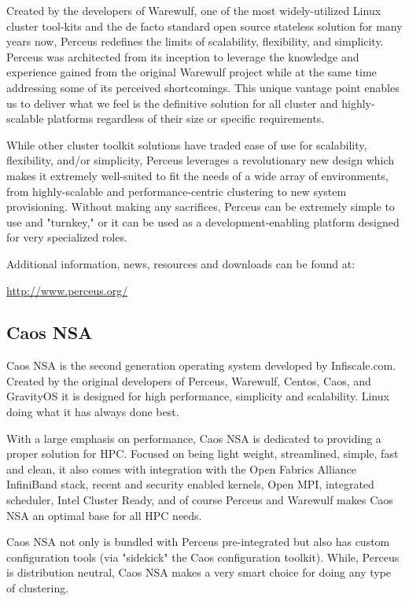 \documentclass[10pt,letterpaper]{article}
\begin{document}
Created by the developers of Warewulf, one of the most widely-utilized Linux
cluster tool-kits and the de facto standard open source stateless solution for
many years now, Perceus redefines the limits of scalability, flexibility, and
simplicity.  Perceus was architected from its inception to leverage the
knowledge and experience gained from the original Warewulf project while at the
same time addressing some of its perceived shortcomings.  This unique vantage
point enables us to deliver what we feel is the definitive solution for all
cluster and highly-scalable platforms regardless of their size or specific
requirements.

While other cluster toolkit solutions have traded ease of use for scalability,
flexibility, and/or simplicity, Perceus leverages a revolutionary new design
which makes it extremely well-suited to fit the needs of a wide array of
environments, from highly-scalable and performance-centric clustering to new
system provisioning. Without making any sacrifices, Perceus can be extremely
simple to use and "turnkey," or it can be used as a development-enabling
platform designed for very specialized roles.

\noindent Additional information, news, resources and downloads can be found
at:

{\ttfamily
\indent \url{http://www.perceus.org/}
}

\subsection{Caos NSA}
Caos NSA is the second generation operating system developed by
Infiscale.com. Created by the original developers of Perceus, Warewulf,
Centos, Caos, and GravityOS it is designed for high performance, simplicity
and scalability. Linux doing what it has always done best.

With a large emphasis on performance, Caos NSA is dedicated to providing a
proper solution for HPC. Focused on being light weight, streamlined, simple,
fast and clean, it also comes with integration with the Open Fabrics Alliance
InfiniBand stack, recent and security enabled kernels, Open MPI, integrated
scheduler, Intel Cluster Ready, and of course Perceus and Warewulf makes
Caos NSA an optimal base for all HPC needs.

Caos NSA not only is bundled with Perceus pre-integrated but also has
custom configuration tools (via "sidekick" the Caos configuration toolkit).
While, Perceus is distribution neutral, Caos NSA makes a very smart choice
for doing any type of clustering.
\end{document}

